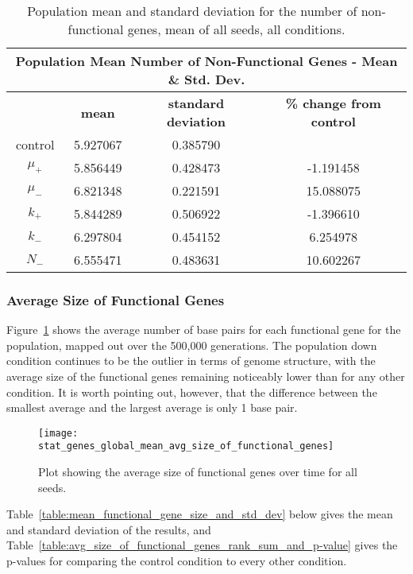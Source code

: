 \begin{table}[h]
	\centering
	\begin{tabular}{|c|c|c|c|}
		\hline
		\multicolumn{4}{c}{\Large \textbf{Population Mean Number of Non-Functional Genes - Mean \& Std. Dev.}} \\
		\hline
		& \textbf{mean} & \textbf{standard deviation} & \textbf{\% change from control} \\
		\hline
		control & 5.927067 & 0.385790 & \textemdash \\ 
		\hline
		$\mu_+$ & 5.856449 & 0.428473 & -1.191458 \\ 
		\hline
		$\mu_-$ & 6.821348 & 0.221591 & 15.088075 \\ 
		\hline
		$k_+$ & 5.844289 & 0.506922 & -1.396610 \\ 
		\hline
		$k_-$ & 6.297804 & 0.454152 & 6.254978 \\ 
		\hline
		$N_-$ & 6.555471 & 0.483631 & 10.602267 \\ 
		\hline
	\end{tabular}
	\caption[Number of Non-functional Genes - Mean \& St. Dev.]{Population mean and standard deviation for the number of non-functional genes, mean of all seeds, all conditions.}
	\label{table:non-functional_genes_mean_std_dev}
\end{table}

\subsubsection{Average Size of Functional Genes}\label{sec:average_size_functional_genes}
Figure~\ref{fig:mean_functional_gene_size} shows the average number of base pairs for each functional gene for the population, mapped out over the 500,000 generations. The population down condition continues to be the outlier in terms of genome structure, with the average size of the functional genes remaining noticeably lower than for any other condition. It is worth pointing out, however, that the difference between the smallest average and the largest average is only 1 base pair. 
\begin{figure}[H]
	\centering
	\texttt{[image: stat\_genes\_global\_mean\_avg\_size\_of\_functional\_genes]}
	\caption[Average size of functional genes]{Plot showing the average size of functional genes over time for all seeds.}
	\label{fig:mean_functional_gene_size}
\end{figure}
Table~\ref{table:mean_functional_gene_size_and_std_dev} below gives the mean and standard deviation of the results, and Table~\ref{table:avg_size_of_functional_genes_rank_sum_and_p-value} gives the p-values for comparing the control condition to every other condition. 

